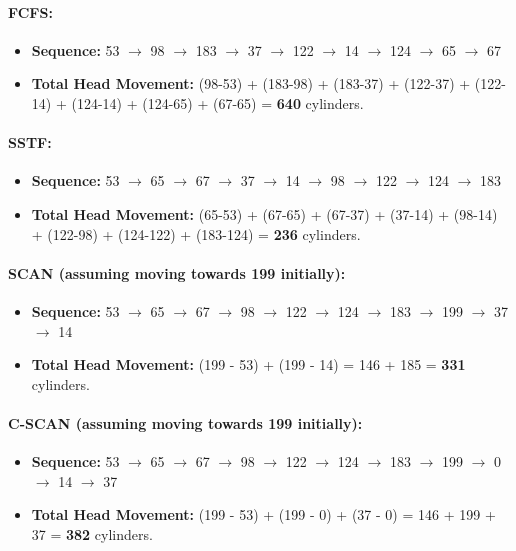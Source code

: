 \documentclass[12pt]{article}
\begin{document}
\paragraph{FCFS:}
\begin{itemize}
    \item \textbf{Sequence:} 53 \(\rightarrow\) 98 \(\rightarrow\) 183 \(\rightarrow\) 37 \(\rightarrow\) 122 \(\rightarrow\) 14 \(\rightarrow\) 124 \(\rightarrow\) 65 \(\rightarrow\) 67
    \item \textbf{Total Head Movement:} (98-53) + (183-98) + (183-37) + (122-37) + (122-14) + (124-14) + (124-65) + (67-65) = \textbf{640} cylinders.
\end{itemize}

\paragraph{SSTF:}
\begin{itemize}
    \item \textbf{Sequence:} 53 \(\rightarrow\) 65 \(\rightarrow\) 67 \(\rightarrow\) 37 \(\rightarrow\) 14 \(\rightarrow\) 98 \(\rightarrow\) 122 \(\rightarrow\) 124 \(\rightarrow\) 183
    \item \textbf{Total Head Movement:} (65-53) + (67-65) + (67-37) + (37-14) + (98-14) + (122-98) + (124-122) + (183-124) = \textbf{236} cylinders.
\end{itemize}

\paragraph{SCAN (assuming moving towards 199 initially):}
\begin{itemize}
    \item \textbf{Sequence:} 53 \(\rightarrow\) 65 \(\rightarrow\) 67 \(\rightarrow\) 98 \(\rightarrow\) 122 \(\rightarrow\) 124 \(\rightarrow\) 183 \(\rightarrow\) 199 \(\rightarrow\) 37 \(\rightarrow\) 14
    \item \textbf{Total Head Movement:} (199 - 53) + (199 - 14) = 146 + 185 = \textbf{331} cylinders.
\end{itemize}

\paragraph{C-SCAN (assuming moving towards 199 initially):}
\begin{itemize}
    \item \textbf{Sequence:} 53 \(\rightarrow\) 65 \(\rightarrow\) 67 \(\rightarrow\) 98 \(\rightarrow\) 122 \(\rightarrow\) 124 \(\rightarrow\) 183 \(\rightarrow\) 199 \(\rightarrow\) 0 \(\rightarrow\) 14 \(\rightarrow\) 37
    \item \textbf{Total Head Movement:} (199 - 53) + (199 - 0) + (37 - 0) = 146 + 199 + 37 = \textbf{382} cylinders.
\end{itemize}
\end{document}
